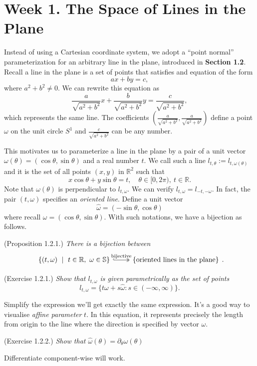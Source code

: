 \section{Week 1. The Space of Lines in the Plane}

Instead of using a Cartesian coordinate system, we adopt a “point normal” parameterization for an arbitrary line in the plane, introduced in \textbf{Section 1.2}.
Recall  a line in the plane is a set of points that satisfies 
and equation of the form
\[
a x + by  = c,
\]
where $a^2 + b^2 \neq 0$.
We can rewrite this equation as 
\[
\frac{a}{\sqrt{a^2 + b^2}} x + \frac{b}{\sqrt{a^2 + b^2}} y = \frac{c}{\sqrt{a^2 + b^2}},
\]
which represents the same line. 
The coefficients $(\frac{a}{\sqrt{a^2 + b^2}}, \frac{a}{\sqrt{a^2 + b^2}})$ define a point $\omega$ on the unit circle $S^1$ and $\frac{c}{\sqrt{a^2 + b^2}}$ can be any number.

This motivates us to parameterize a line in the plane by a pair of a unit vector $\omega(\theta) = (\cos \theta, \sin \theta)$ and a real number $t$.
We call such a line $l_{t,\theta}:=l_{t, \omega(\theta)}$ and it is the set of all points $(x,y)$ in $\mathbb{R}^2$ such that 
\[
x\cos \theta  + y\sin \theta = t, \quad \theta \in [0, 2\pi), \ t \in \mathbb{R}.
\]
Note that $\omega(\theta)$ is perpendicular to $l_{t, \omega}$.
We can verify $l_{t, \omega} = l_{-t, -\omega}$.
In fact, the pair $(t,\omega)$ specifies an \textit{oriented line}. Define a unit vector 
\[\hat{\omega}=(-\sin \theta,\cos \theta)\] where recall $\omega=(\cos \theta,\sin \theta)$. 
With such notations, we have a bijection as follows.


\begin{Proposition}{(Proposition 1.2.1.)}%
\textit{There is a bijection between} 
\[\begin{tikzcd}
	{\{(t,\omega) ~\mid~ t\in \mathbb R,~ \omega\in\mathbb S\}} & {\{\text{oriented lines in the plane}\}}
	\arrow["{\text{bijective}}", hook, two heads, from=1-1, to=1-2]
\end{tikzcd}.\]
\end{Proposition}

\begin{Exercise}{(Exercise 1.2.1.)}
\textit{Show that $l_{t,\omega}$ is given parametrically as the set of points
\[
l_{t, \omega} = \{t \omega + s \hat{\omega}: s \in (-\infty, \infty)\}.
\]}
\end{Exercise}
\begin{anw}
Simplify the expression we'll get exactly the same expression. It's a good way to visualise \textit{affine parameter} $t$. In this equation, it represents precisely the length from origin to the line where the direction is specified by vector $\omega$.
\end{anw}

\begin{Exercise}{(Exercise 1.2.2.)}
\textit{Show that $\hat{\omega}(\theta) = \partial_\theta \omega(\theta)$}
\end{Exercise}
\begin{anw}
Differentiate component-wise will work.
\end{anw}